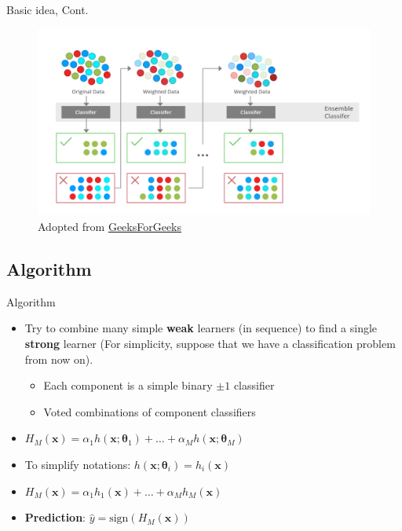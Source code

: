 \documentclass[serif, aspectratio=169]{beamer}
\begin{document}
\begin{frame}{Basic idea, Cont.}
    \begin{center}
    \begin{figure}[bh]
        \includegraphics[width=\textwidth]{pic/boosting.png}
        {\scriptsize Adopted from \href{https://www.geeksforgeeks.org/bagging-vs-boosting-in-machine-learning/}{GeeksForGeeks}}
    \end{figure}
    \endminipage
    \end{center}
\end{frame}

\subsection{Algorithm}

\begin{frame}{Algorithm}
    \begin{itemize}
        \itemsep1em
        \justifying
        \item Try to combine many simple \textbf{weak} learners (in sequence) to find a single \textbf{strong} learner (For simplicity, suppose that we have a classification problem from now on).
        \begin{itemize}
            \itemsep0.25em
            \item Each component is a simple binary $\pm1$ classifier
            \item Voted combinations of component classifiers
        \end{itemize}
        \item[] \begin{center}
        $H_M(\boldsymbol{x})=\alpha_1h(\boldsymbol{x};\boldsymbol{\theta}_1)+\dots+\alpha_Mh(\boldsymbol{x};\boldsymbol{\theta}_M)$
        \end{center} 
        \item To simplify notations: $h(\boldsymbol{x};\boldsymbol{\theta}_i)=h_i(\boldsymbol{x})$
        \item[] \begin{center}
            $H_M(\boldsymbol{x})=\alpha_1h_1(\boldsymbol{x})+\dots+\alpha_Mh_M(\boldsymbol{x})$
        \end{center}
        \item \textbf{Prediction}: $\hat{y}=\text{sign}(H_M(\boldsymbol{x}))$
    \end{itemize}
\end{frame}
\end{document}
